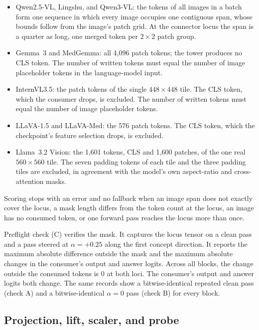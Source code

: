 \documentclass{article}
\begin{document}
\begin{itemize}[leftmargin=*,itemsep=1pt,topsep=2pt]
\item Qwen2.5-VL, Lingshu, and Qwen3-VL: the tokens of all images in a batch form one sequence in which every image occupies one contiguous span, whose bounds follow from the image's patch grid. At the connector locus the span is a quarter as long, one merged token per $2\times2$ patch group.
\item Gemma~3 and MedGemma: all 4{,}096 patch tokens; the tower produces no CLS token. The number of written tokens must equal the number of image placeholder tokens in the language-model input.
\item InternVL3.5: the patch tokens of the single $448\times448$ tile. The CLS token, which the consumer drops, is excluded. The number of written tokens must equal the number of image placeholder tokens.
\item LLaVA-1.5 and LLaVA-Med: the 576 patch tokens. The CLS token, which the checkpoint's feature selection drops, is excluded.
\item Llama~3.2 Vision: the 1{,}601 tokens, CLS and 1{,}600 patches, of the one real $560\times560$ tile. The seven padding tokens of each tile and the three padding tiles are excluded, in agreement with the model's own aspect-ratio and cross-attention masks.
\end{itemize}

Scoring stops with an error and no fallback when an image span does not exactly cover the locus, a mask length differs from the token count at the locus, an image has no consumed token, or one forward pass reaches the locus more than once.

Preflight check (C) verifies the mask. It captures the locus tensor on a clean pass and a pass steered at $\alpha=+0.25$ along the first concept direction. It reports the maximum absolute difference outside the mask and the maximum absolute changes in the consumer's output and answer logits. Across all \cfBlocks{} blocks, the change outside the consumed tokens is $0$ at both loci. The consumer's output and answer logits both change. The same records show a bitwise-identical repeated clean pass (check A) and a bitwise-identical $\alpha=0$ pass (check B) for every block.

\subsection{Projection, lift, scaler, and probe}
\label{app:repro-probe}
\end{document}
